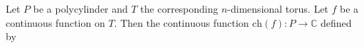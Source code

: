 Let $P$ be a polycylinder and $T$ the corresponding $n$-dimensional torus. Let $f$ be a continuous function on $T$. Then the continuous function $\text{ch}(f): P \rightarrow \mathbb{C}$ defined by

